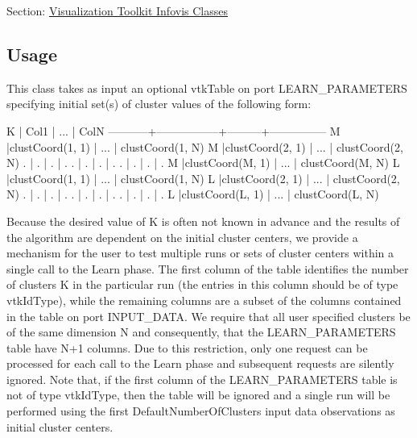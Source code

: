 Section\-: \hyperlink{sec_vtkinfovis}{Visualization Toolkit Infovis Classes} \hypertarget{vtkwidgets_vtkxyplotwidget_Usage}{}\subsection{Usage}\label{vtkwidgets_vtkxyplotwidget_Usage}
This class takes as input an optional vtk\-Table on port L\-E\-A\-R\-N\-\_\-\-P\-A\-R\-A\-M\-E\-T\-E\-R\-S specifying initial set(s) of cluster values of the following form\-: 
\begin{DoxyPre}
           K     | Col1            |  ...    | ColN    
      -----------+-----------------+---------+---------------
           M     |clustCoord(1, 1) |  ...    | clustCoord(1, N)
           M     |clustCoord(2, 1) |  ...    | clustCoord(2, N)
           .     |       .         |   .     |        .
           .     |       .         |   .     |        .
           .     |       .         |   .     |        .
           M     |clustCoord(M, 1) |  ...    | clustCoord(M, N)
           L     |clustCoord(1, 1) |  ...    | clustCoord(1, N)
           L     |clustCoord(2, 1) |  ...    | clustCoord(2, N)
           .     |       .         |   .     |        .
           .     |       .         |   .     |        .
           .     |       .         |   .     |        .
           L     |clustCoord(L, 1) |  ...    | clustCoord(L, N)
 \end{DoxyPre}


Because the desired value of K is often not known in advance and the results of the algorithm are dependent on the initial cluster centers, we provide a mechanism for the user to test multiple runs or sets of cluster centers within a single call to the Learn phase. The first column of the table identifies the number of clusters K in the particular run (the entries in this column should be of type vtk\-Id\-Type), while the remaining columns are a subset of the columns contained in the table on port I\-N\-P\-U\-T\-\_\-\-D\-A\-T\-A. We require that all user specified clusters be of the same dimension N and consequently, that the L\-E\-A\-R\-N\-\_\-\-P\-A\-R\-A\-M\-E\-T\-E\-R\-S table have N+1 columns. Due to this restriction, only one request can be processed for each call to the Learn phase and subsequent requests are silently ignored. Note that, if the first column of the L\-E\-A\-R\-N\-\_\-\-P\-A\-R\-A\-M\-E\-T\-E\-R\-S table is not of type vtk\-Id\-Type, then the table will be ignored and a single run will be performed using the first Default\-Number\-Of\-Clusters input data observations as initial cluster centers.

